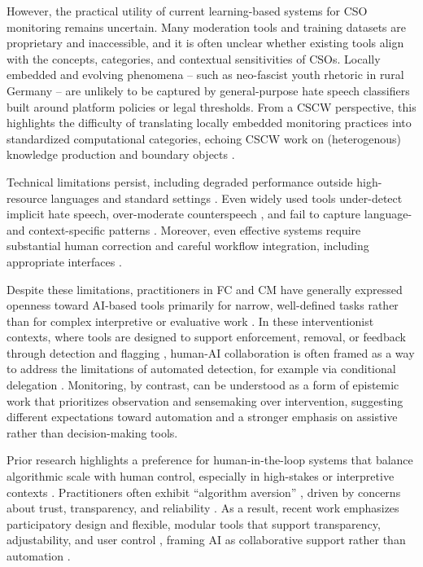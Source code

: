 \documentclass[acmsmall]{acmart}
\begin{document}
However, the practical utility of current learning-based systems for CSO monitoring remains uncertain. Many moderation tools and training datasets are proprietary and inaccessible, and it is often unclear whether existing tools align with the concepts, categories, and contextual sensitivities of CSOs. Locally embedded and evolving phenomena -- such as neo-fascist youth rhetoric in rural Germany -- are unlikely to be captured by general-purpose hate speech classifiers built around platform policies or legal thresholds. From a CSCW perspective, this highlights the difficulty of translating locally embedded monitoring practices into standardized computational categories, echoing CSCW work on (heterogenous) knowledge production and boundary objects \cite{star_institutional_1989,star_steps_1994,ackerman_sharing_2013}.


Technical limitations persist, including degraded performance outside high-resource languages and standard settings \cite{koenecke_etal_2020,nordis_policy_2022}. Even widely used tools under-detect implicit hate speech, over-moderate counterspeech \cite{Hartmann_2025}, and fail to capture language- and context-specific patterns \cite{nozza_exposing_2021,kovacs_challenges_2021}.
Moreover, even effective systems require substantial human correction and careful workflow integration, including appropriate interfaces \cite{skopik_osint_nlp_2024}.

Despite these limitations, practitioners in FC and CM have generally expressed openness toward AI-based tools primarily for narrow, well-defined tasks rather than for complex interpretive or evaluative work \cite{liu_human-centered_2024,nordis_policy_2022,hrckova_autonomation_2024}. 
In these interventionist contexts, where tools are designed to support enforcement, removal, or feedback through detection and flagging  \cite{schluger_proactive_2022,seering_chillbot_2024,bozarth_wisdom_2023}, human-AI collaboration is often framed as a way to address the limitations of automated detection, for example via conditional delegation \cite{lai_human-ai_2022}.
Monitoring, by contrast, can be understood as a form of epistemic work that prioritizes observation and sensemaking over intervention, suggesting different expectations toward automation and a stronger emphasis on assistive rather than decision-making tools.

Prior research highlights a preference for human-in-the-loop systems that balance algorithmic scale with human control, especially in high-stakes or interpretive contexts \cite{demartini_human_loop_2020,liu_human-centered_2024,nakov_automated_2021}. Practitioners often exhibit ``algorithm aversion'' \cite{liu_human-centered_2024}, driven by concerns about trust, transparency, and reliability \cite{nguyen_believe_2018,hrckova_autonomation_2024}. As a result, recent work emphasizes participatory design \cite{hancock_seeing_2024} and flexible, modular tools that support transparency, adjustability, and user control \cite{nakov_automated_2021,nordis_report_2022,das_state_2023,wolfe_implications_2024,baumler_harnessing_2025,schopke_ots_2025}, framing AI as collaborative support rather than automation \cite{morris_is_2024}.
\end{document}
